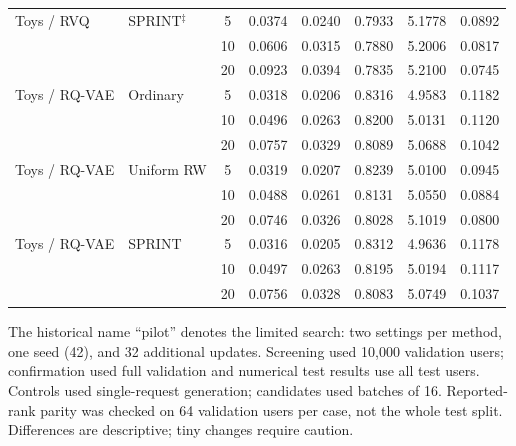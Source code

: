 \begin{table}[p]
\begin{tabular}{llcccccc}
Toys / RVQ & SPRINT$^{\ddagger}$ & 5 & 0.0374 & 0.0240 & 0.7933 & 5.1778 & 0.0892 \\
 &  & 10 & 0.0606 & 0.0315 & 0.7880 & 5.2006 & 0.0817 \\
 &  & 20 & 0.0923 & 0.0394 & 0.7835 & 5.2100 & 0.0745 \\
\midrule
Toys / RQ-VAE & Ordinary & 5 & 0.0318 & 0.0206 & 0.8316 & 4.9583 & 0.1182 \\
 &  & 10 & 0.0496 & 0.0263 & 0.8200 & 5.0131 & 0.1120 \\
 &  & 20 & 0.0757 & 0.0329 & 0.8089 & 5.0688 & 0.1042 \\
Toys / RQ-VAE & Uniform RW & 5 & 0.0319 & 0.0207 & 0.8239 & 5.0100 & 0.0945 \\
 &  & 10 & 0.0488 & 0.0261 & 0.8131 & 5.0550 & 0.0884 \\
 &  & 20 & 0.0746 & 0.0326 & 0.8028 & 5.1019 & 0.0800 \\
Toys / RQ-VAE & SPRINT & 5 & 0.0316 & 0.0205 & 0.8312 & 4.9636 & 0.1178 \\
 &  & 10 & 0.0497 & 0.0263 & 0.8195 & 5.0194 & 0.1117 \\
 &  & 20 & 0.0756 & 0.0328 & 0.8083 & 5.0749 & 0.1037 \\
\bottomrule
\end{tabular}
\par\smallskip\footnotesize The historical name ``pilot'' denotes the limited search: two settings per method, one seed (42), and 32 additional updates. Screening used 10,000 validation users; confirmation used full validation and numerical test results use all test users. Controls used single-request generation; candidates used batches of 16. Reported-rank parity was checked on 64 validation users per case, not the whole test split. Differences are descriptive; tiny changes require caution.
\end{table}

